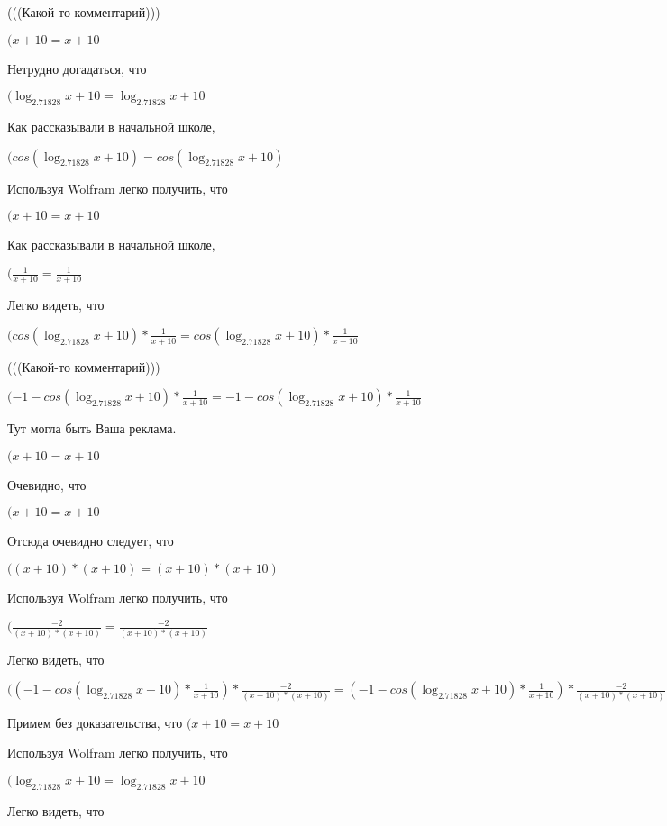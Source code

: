\documentclass[12pt,a4paper,fleqn]{article}
\theoremstyle{definition}
\begin{document}
(((Какой-то комментарий)))

$( x  +  10  =  x  +  10 $

Нетрудно догадаться, что

$(\log_{ 2.71828 }{ x  +  10 } = \log_{ 2.71828 }{ x  +  10 }$

Как рассказывали в начальной школе,

$(cos(\log_{ 2.71828 }{ x  +  10 }) = cos(\log_{ 2.71828 }{ x  +  10 })$

Используя Wolfram легко получить, что

$( x  +  10  =  x  +  10 $

Как рассказывали в начальной школе,

$(\frac{ 1 }{ x  +  10 }
 = \frac{ 1 }{ x  +  10 }
$

Легко видеть, что

$(cos(\log_{ 2.71828 }{ x  +  10 }) * \frac{ 1 }{ x  +  10 }
 = cos(\log_{ 2.71828 }{ x  +  10 }) * \frac{ 1 }{ x  +  10 }
$

(((Какой-то комментарий)))

$( -1  - cos(\log_{ 2.71828 }{ x  +  10 }) * \frac{ 1 }{ x  +  10 }
 =  -1  - cos(\log_{ 2.71828 }{ x  +  10 }) * \frac{ 1 }{ x  +  10 }
$

Тут могла быть Ваша реклама.

$( x  +  10  =  x  +  10 $

Очевидно, что

$( x  +  10  =  x  +  10 $

Отсюда очевидно следует, что

$(( x  +  10 ) * ( x  +  10 ) = ( x  +  10 ) * ( x  +  10 )$

Используя Wolfram легко получить, что

$(\frac{ -2 }{( x  +  10 ) * ( x  +  10 )}
 = \frac{ -2 }{( x  +  10 ) * ( x  +  10 )}
$

Легко видеть, что

$(( -1  - cos(\log_{ 2.71828 }{ x  +  10 }) * \frac{ 1 }{ x  +  10 }
) * \frac{ -2 }{( x  +  10 ) * ( x  +  10 )}
 = ( -1  - cos(\log_{ 2.71828 }{ x  +  10 }) * \frac{ 1 }{ x  +  10 }
) * \frac{ -2 }{( x  +  10 ) * ( x  +  10 )}
$

Примем без доказательства, что
$( x  +  10  =  x  +  10 $

Используя Wolfram легко получить, что

$(\log_{ 2.71828 }{ x  +  10 } = \log_{ 2.71828 }{ x  +  10 }$

Легко видеть, что
\end{document}
